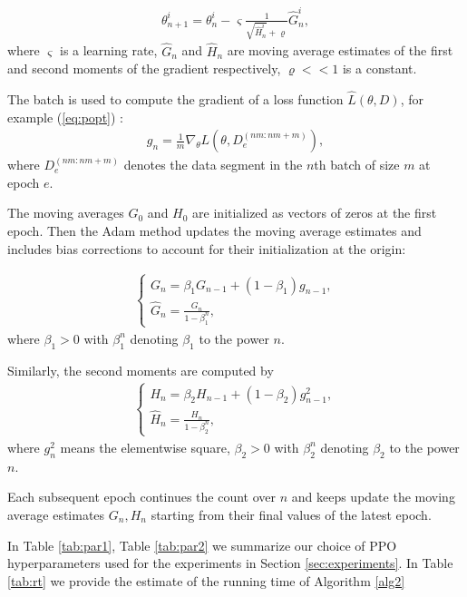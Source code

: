 \documentclass[11pt]{article}
\theoremstyle{definition}
\numberwithin{equation}{section}
\begin{document}
     \begin{align*}
     \theta_{n+1}^i = \theta_n^i - \varsigma \frac{1}{\sqrt{\hat H^i_n} +\varrho} \hat G^i_n,
     \end{align*}
     where $\varsigma$ is a learning rate, $\hat G_n$ and $\hat H_n$ are moving average estimates of the first and second moments of the gradient respectively, $\varrho<<1$ is a constant.

     The batch is used to compute the gradient of a loss function $\hat L(\theta, D)$, for example  (\ref{eq:popt}) :
    \begin{align}\label{grad}
    g_n = \frac{1}{m} \nabla_\theta   L\left(\theta,  D_e^{ (nm:nm+m)}\right),
    \end{align}
where $D_e^{ (nm:nm+m)}$ denotes the data segment in the $n$th batch of size $m$ at epoch $e$.

 The moving averages $G_{0}$ and $H_0$ are initialized as vectors of zeros at the first epoch.   Then    the Adam method updates the moving average estimates   and includes bias corrections to   account for their initialization at the origin:

   \begin{align*}
   \begin{cases}
    G_{n} = \beta_1 G_{n-1} +(1-\beta_1) g_{n-1},\\
    \hat G_{n} = \frac{G_{n}}{1 - \beta_1^n},
    \end{cases}
    \end{align*}
where  $\beta_1>0$  with $\beta_1^n$  denoting $\beta_1$ to the power $n$.

    Similarly, the second moments are computed by
    \begin{align*}
    \begin{cases}
    H_{n} = \beta_2 H_{n-1} +(1-\beta_2)  g_{n-1}^2,\\
    \hat H_{n} = \frac{H_{n}}{1 - \beta_2^n},
    \end{cases}
    \end{align*}
    where $g_n^2$ means the elementwise square, $\beta_2>0$   with $\beta_2^n$  denoting $\beta_2$ to the power $n$.



 Each subsequent epoch continues   the count over $n$  and keeps  update the moving average estimates $G_n, H_n$  starting from their final values of the latest  epoch.

In Table \ref{tab:par1}, Table \ref{tab:par2} we summarize our choice of PPO hyperparameters used for  the experiments in Section \ref{sec:experiments}. In Table \ref{tab:rt} we provide the estimate of the running time of Algorithm \ref{alg2}
\end{document}
